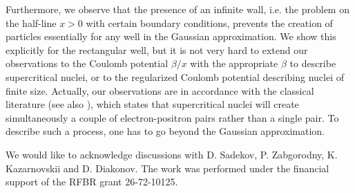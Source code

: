 \documentclass[12pt]{article}
\begin{document}
Furthermore, we observe that the presence of an infinite wall, i.e. the problem on the half-line $x>0$ with certain boundary conditions, prevents the creation of particles essentially for any well in the Gaussian approximation. We show this explicitly for the rectangular well, but it is not very hard to extend our observations to the Coulomb potential $\beta/x$ with the appropriate $\beta$ to describe supercritical nuclei, or to the regularized Coulomb potential describing nuclei of finite size. Actually, our observations are in accordance with the classical literature \cite{landau1983quantum} (see also \cite{gershtein1970positron}), which states that supercritical nuclei will create simultaneously a couple of electron-positron pairs rather than a single pair. To describe such a process, one has to go beyond the Gaussian approximation.

We would like to acknowledge discussions with D. Sadekov, P. Zabgorodny, K. Kazarnovskii and D. Diakonov. The work was performed under the financial support of the RFBR grant 26-72-10125.
    
	
	
	
	
	
	
	
	
	
	
	
	
	
\end{document}
